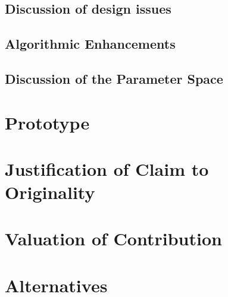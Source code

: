 \subsection{Discussion of design issues}


\subsection{Algorithmic Enhancements}


\subsection{Discussion of the Parameter Space}


\section{Prototype}

\section{Justification of Claim to Originality}

\section{Valuation of Contribution}

\section{Alternatives}
